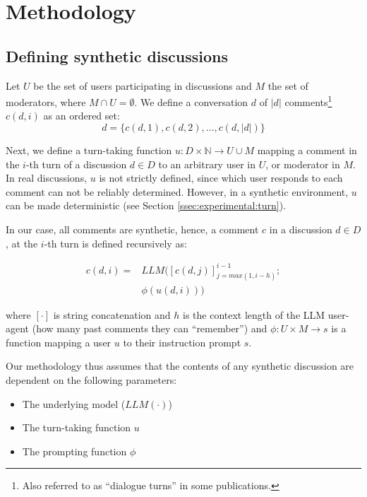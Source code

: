 %

\section{Methodology}
\label{sec:methodology}

\subsection{Defining synthetic discussions}
\label{ssec:methodology:discussions}

Let $U$ be the set of users participating in discussions and $M$ the set of moderators, where $M \cap U = \emptyset$. We define a conversation $d$ of $\lvert d \rvert$ comments\footnote{Also referred to as “dialogue turns” in some publications.} $c(d, i)$ as an ordered set:
\begin{equation}
    d = \{c(d, 1), c(d, 2), \ldots, c(d, \lvert d \rvert)\}
\end{equation}


Next, we define a turn-taking function $u: D  \times \mathbb{N} \rightarrow U \cup M$ mapping a comment in the $i$-th turn of a discussion $d \in D$ to an arbitrary user in $U$, or moderator in $M$. In real discussions, $u$ is not strictly defined, since which user responds to each comment can not be reliably determined. However, in a synthetic environment, $u$ can be made deterministic (see Section \ref{ssec:experimental:turn}).

In our case, all comments are synthetic, hence, a comment $c$ in a discussion $d \in D$, at the $i$-th turn is defined recursively as:

\begin{equation}
\label{eq:comment}
\begin{split}
    c(d, i) = & LLM([c(d, j)]^{i-1}_{j=max(1, i-h)};\\
    &\phi(u(d, i)))
\end{split}
\end{equation}

\noindent where $[\cdot]$ is string concatenation and $h$ is the context length of the \ac{LLM} user-agent (how many past comments they can “remember”) and $\phi: U \times M \rightarrow s$ is a function mapping a user $u$ to their instruction prompt $s$.

Our methodology thus assumes that the contents of any synthetic discussion are dependent on the following parameters:
\begin{itemize}[noitemsep]
    \item The underlying model ($LLM(\cdot)$)
    \item The turn-taking function $u$
    \item The prompting function $\phi$
\end{itemize}


